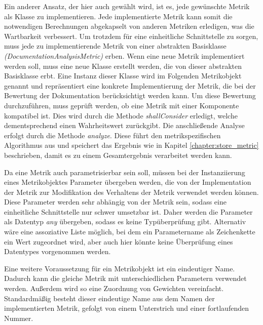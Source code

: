 Ein anderer Ansatz, der hier auch gewählt wird, ist es, jede gewünschte Metrik als Klasse zu implementieren. Jede implementierte Metrik kann somit die notwendigen Berechnungen abgekapselt von anderen Metriken erledigen, was die Wartbarkeit verbessert. Um trotzdem für eine einheitliche Schnittstelle zu sorgen, muss jede zu implementierende Metrik von einer abstrakten Basisklasse \textit{(DocumentationAnalysisMetric)} erben. Wenn eine neue Metrik implementiert werden soll, muss eine neue Klasse erstellt werden, die von dieser abstrakten Basisklasse erbt. Eine Instanz dieser Klasse wird im Folgenden Metrikobjekt genannt und repräsentiert eine konkrete Implementierung der Metrik, die bei der Bewertung der Dokumentation berücksichtigt werden kann. Um diese Bewertung durchzuführen, muss geprüft werden, ob eine Metrik mit einer Komponente kompatibel ist. Dies wird durch die  Methode \textit{shallConsider} erledigt,  welche dementsprechend einen Wahrheitswert zurückgibt. Die anschließende Analyse erfolgt durch die Methode \textit{analyze}. Diese führt den metrikspezifischen Algorithmus aus und speichert das Ergebnis wie in Kapitel \ref{chapter:store_metric} beschrieben, damit es zu einem Gesamtergebnis verarbeitet werden kann.

Da eine Metrik auch parametrisierbar sein soll, müssen bei der Instanziierung  eines Metrikobjektes Parameter übergeben werden, die von der Implementation der Metrik zur Modifikation des Verhaltens der Metrik verwendet werden können. Diese Parameter werden sehr abhängig von der Metrik sein, sodass eine einheitliche Schnittstelle nur schwer umsetzbar ist. Daher werden die Parameter als Datentyp \textit{any} übergeben, sodass es keine Typüberprüfung gibt. Alternativ wäre eine assoziative Liste möglich, bei dem ein Parametername als Zeichenkette ein Wert zugeordnet wird, aber auch hier könnte keine Überprüfung eines Datentypes vorgenommen werden. 

Eine  weitere Voraussetzung für ein Metrikobjekt ist ein eindeutiger Name. Dadurch kann die gleiche Metrik mit unterschiedlichen Parametern verwendet werden. Außerdem wird so eine Zuordnung von Gewichten vereinfacht. Standardmäßig besteht dieser eindeutige Name aus dem Namen der implementierten Metrik, gefolgt von einem Unterstrich und einer fortlaufenden Nummer.


